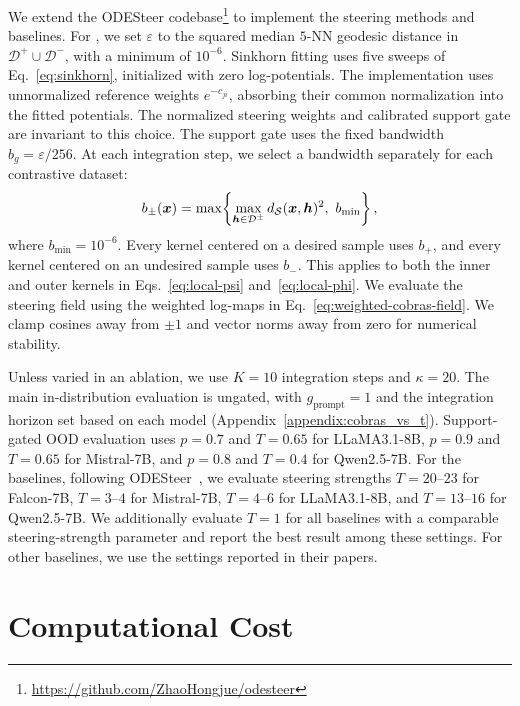 We extend the ODESteer codebase\footnote{\url{https://github.com/ZhaoHongjue/odesteer}} to implement the steering methods and baselines. For \Cobras, we set $\varepsilon$ to the squared median $5$-NN geodesic distance in $\mathcal{D}^+\cup\mathcal{D}^-$, with a minimum of $10^{-6}$. Sinkhorn fitting uses five sweeps of Eq.~\eqref{eq:sinkhorn}, initialized with zero log-potentials. The implementation uses unnormalized reference weights $e^{-c_{ji}}$, absorbing their common normalization into the fitted potentials. The normalized steering weights and calibrated support gate are invariant to this choice. The support gate uses the fixed bandwidth $b_g=\varepsilon/256$. At each integration step, we select a bandwidth separately for each contrastive dataset:
\begin{equation}
b_\pm(\boldsymbol{x})=
\max\!\left\{\max_{\boldsymbol{h}\in\mathcal{D}^\pm}
d_{\mathcal{S}}(\boldsymbol{x},\boldsymbol{h})^2,\ b_{\min}\right\},
\label{eq:adaptive-bandwidth}
\end{equation}
where $b_{\min}=10^{-6}$. Every kernel centered on a desired sample uses $b_+$, and every kernel centered on an undesired sample uses $b_-$. This applies to both the inner and outer kernels in Eqs.~\eqref{eq:local-psi} and~\eqref{eq:local-phi}. We evaluate the steering field using the weighted log-maps in Eq.~\eqref{eq:weighted-cobras-field}. We clamp cosines away from $\pm1$ and vector norms away from zero for numerical stability.

Unless varied in an ablation, we use $K=10$ integration steps and $\kappa=20$. The main in-distribution evaluation is ungated, with $g_{\mathrm{prompt}}=1$ and the integration horizon set based on each model (Appendix~\ref{appendix:cobras_vs_t}). Support-gated OOD evaluation uses $p=0.7$ and $T=0.65$ for LLaMA3.1-8B, $p=0.9$ and $T=0.65$ for Mistral-7B, and $p=0.8$ and $T=0.4$ for Qwen2.5-7B. For the baselines, following ODESteer~\cite{zhaoodesteer}, we evaluate steering strengths $T=20$--$23$ for Falcon-7B, $T=3$--$4$ for Mistral-7B, $T=4$--$6$ for LLaMA3.1-8B, and $T=13$--$16$ for Qwen2.5-7B. We additionally evaluate $T=1$ for all baselines with a comparable steering-strength parameter and report the best result among these settings. For other baselines, we use the settings reported in their papers.

\section{Computational Cost}
\label{apx:computational-cost}

